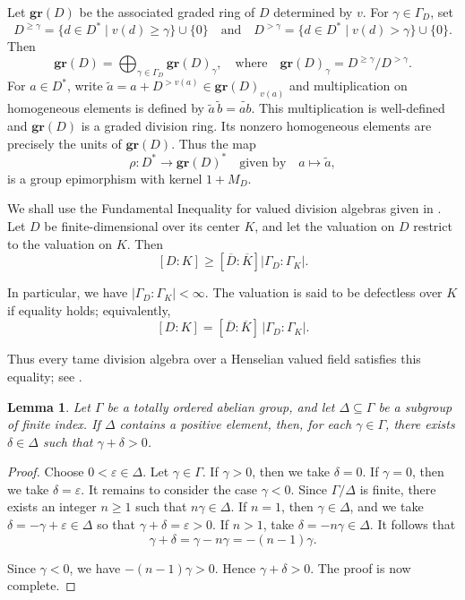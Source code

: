 \documentclass[11pt]{amsart}
\newtheorem{lemma}[theorem]{Lemma}
\theoremstyle{definition}
\begin{document}
Let $\mathbf{gr}(D)$ be the associated graded ring of $D$ determined by $v$. For $\gamma\in\Gamma_D$, set 
$$
D^{\geq\gamma}=\{d\in D^*\mid v(d)\geq\gamma\}\cup\{0\} \quad
\text{and}
\quad
D^{>\gamma}=\{d\in D^*\mid v(d)>\gamma\}\cup\{0\}. 
$$
Then 
$$
\mathbf{gr}(D)=\bigoplus_{\gamma\in\Gamma_D}\mathbf{gr}(D)_\gamma, 
\quad 
\text{where}
\quad
\mathbf{gr}(D)_\gamma=D^{\geq\gamma}/D^{>\gamma}. 
$$
For $a\in D^*$, write $\widetilde a=a+D^{>v(a)}\in \mathbf{gr}(D)_{v(a)}$ and multiplication on homogeneous elements is defined by $\widetilde a\,\widetilde b=\widetilde{ab}$. This multiplication is well-defined and $\mathbf{gr}(D)$ is a graded division ring. Its nonzero homogeneous elements are precisely the units of $\mathbf{gr}(D)$. Thus the map 
\[ 
\rho:D^*\longrightarrow \mathbf{gr}(D)^*
\quad\text{given by}\quad
a\longmapsto \widetilde a, \] is a group epimorphism with kernel $1+M_D$.

We shall use the Fundamental Inequality for valued division algebras given in \cite[Prop.~1.3]{TW}.  Let $D$ be finite-dimensional over its center $K$, and let the valuation on $D$ restrict to the valuation on $K$. Then
\begin{equation}\label{eq:ineqality}
    [D:K] \geq [\overline D:\overline K]|\Gamma_D:\Gamma_K|.
\end{equation}

In particular, we have $|\Gamma_D:\Gamma_K|<\infty$.  The valuation is said to be defectless over $K$ if equality holds; equivalently,
\begin{equation}\label{eq:eqality}
    [D:K]=[\overline D:\overline K]\,|\Gamma_D:\Gamma_K|.
\end{equation}

Thus every tame division algebra over a Henselian valued field satisfies this equality; see \cite[Def.~8.4]{TW}.  

\begin{lemma}\label{lem:finite-index-cofinal}
Let $\Gamma$ be a totally ordered abelian group, and let $\Delta\subseteq\Gamma$ be a subgroup of finite index. If $\Delta$ contains a positive element, then, for each $\gamma\in\Gamma$, there exists $\delta\in\Delta$ such that $\gamma+\delta>0$.
\end{lemma}

\begin{proof}
Choose $0<\varepsilon\in\Delta$. Let $\gamma\in\Gamma$. If $\gamma>0$, then we take $\delta=0$. If $\gamma=0$, then we take $\delta=\varepsilon$. It remains to consider the case $\gamma<0$. Since $\Gamma/\Delta$ is finite, there exists an integer $n\geq 1$ such that $n\gamma\in\Delta$. If $n=1$, then $\gamma\in\Delta$, and we take $\delta=-\gamma+\varepsilon\in\Delta$ so that $\gamma+\delta=\varepsilon>0$. If $n>1$, take $\delta=-n\gamma\in\Delta$. It follows that
$$        \gamma+\delta
        =
        \gamma-n\gamma
        =
        -(n-1)\gamma.$$

Since $\gamma<0$, we have $-(n-1)\gamma>0$. Hence $\gamma+\delta>0$. The proof is now complete.
\end{proof}
\end{document}
